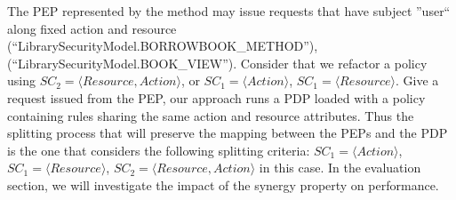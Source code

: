 The PEP represented by the method  may issue requests that have subject ''user`` along fixed action 
and resource (``LibrarySecurityModel.BORROWBOOK\_METHOD''), (``LibrarySecurityModel.BOOK\_VIEW'').
Consider that we refactor a policy using $SC_{2}=\langle Resource,Action\rangle$, or $SC_{1}=\langle Action\rangle$, $SC_{1}=\langle Resource\rangle$.
Give a request issued from the PEP, our approach runs a PDP loaded with a policy containing rules sharing the same action and resource attributes. 
Thus the splitting process that will preserve the mapping between the PEPs and the PDP is the one that considers the following splitting criteria: 
$SC_{1}=\langle Action\rangle$, $SC_{1}=\langle Resource\rangle$, $SC_{2}=\langle Resource,Action\rangle$ in this case.
In the evaluation section, we will investigate the impact of the synergy property on performance.



